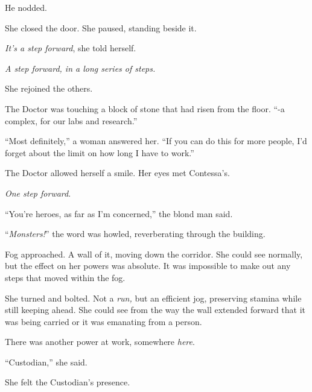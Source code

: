 He nodded.



She closed the door.  She paused, standing beside it.



\emph{It's a step forward}, she told herself.



\emph{A step forward, in a long series of steps.}



She rejoined the others.



The Doctor was touching a block of stone that had risen from the floor.  ``-a complex, for our labs and research.''



``Most definitely,'' a woman answered her.  ``If you can do this for more people, I'd forget about the limit on how long I have to work.''



The Doctor allowed herself a smile.  Her eyes met Contessa's.



\emph{One step forward}.



``You're heroes, as far as I'm concerned,'' the blond man said.



\blacksquare



``\emph{Monsters!}'' the word was howled, reverberating through the building.



Fog approached.  A wall of it, moving down the corridor.  She could see normally, but the effect on her powers was absolute.  It was impossible to make out any steps that moved within the fog.



She turned and bolted.  Not a \emph{run,} but an efficient jog, preserving stamina while still keeping ahead.  She could see from the way the wall extended forward that it was being carried or it was emanating from a person.



There was another power at work, somewhere \emph{here}.



``Custodian,'' she said.



She felt the Custodian's presence.



